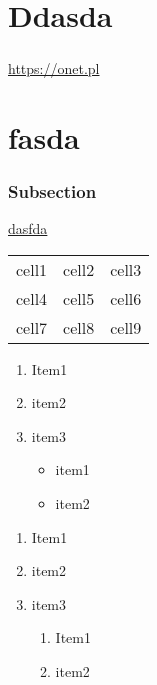 \documentclass{report}
\begin{document}
    \chapter{Ddasda}

    \paragraph{\blindtext}
    \paragraph{\blindtext}
    \paragraph{\blindtext}
    \url{https://onet.pl}
    \chapter{fasda}
    \subsection{Subsection}
    \underline{dasfda}

    \begin{center}
        \begin{tabular}{ c c c }
         cell1 & cell2 & cell3 \\ 
         cell4 & cell5 & cell6 \\  
         cell7 & cell8 & cell9    
        \end{tabular}
    \end{center}

    \begin{enumerate}
        \item Item1
        \item item2 
        \item item3 
            \begin{itemize}
                \item item1
                \item item2
            \end{itemize}
    \end{enumerate}
    \begin{enumerate}
        \item Item1
        \item item2
        \item item3 \begin{enumerate}
                \item Item1
                \item item2
            \end{enumerate}
    \end{enumerate}
\end{document}
